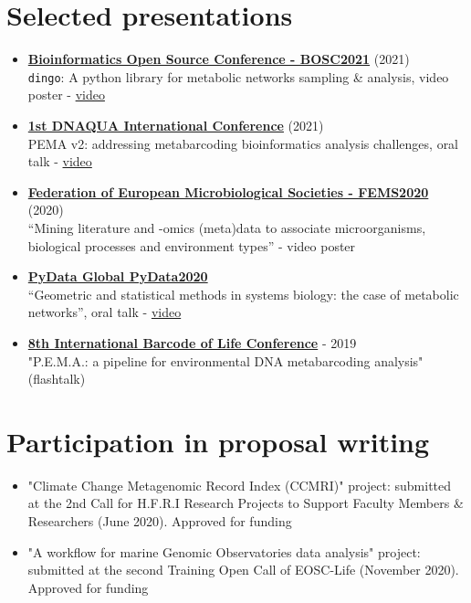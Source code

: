 \section*{Selected presentations}
\begin{itemize}
   \item \textbf{\href{https://www.open-bio.org/events/bosc-2021/}{Bioinformatics Open Source Conference - BOSC2021}} (2021) \\
         \texttt{dingo}: A python library for metabolic networks sampling \& analysis, video poster - \href{https://www.youtube.com/watch?v=IyRD4N6iBu0&t=1s}{video}
   \item \textbf{\href{https://symposium.inrae.fr/dnaqua-conference-evian2021/}{1st DNAQUA International Conference}} (2021)\\
         PEMA v2: addressing metabarcoding bioinformatics analysis challenges, oral talk - \href{https://www.youtube.com/watch?v=kht_LKMmB6w}{video} 
   \item  \textbf{\href{https://fems2020belgrade.com/}{Federation of European Microbiological Societies - FEMS2020}} (2020) \\
         “Mining literature and -omics (meta)data to associate microorganisms, biological processes and environment types” - video poster
   \item \textbf{\href{https://pydata.org/global2020/}{PyData Global PyData2020}} \\
   “Geometric and statistical methods in systems biology: the case of metabolic networks”, oral talk - \href{https://www.youtube.com/watch?v=zg8KFZ_LbHM}{video}
   \item \textbf{\href{http://dnabarcodes2019.org/}{8th International Barcode of Life Conference}} - 2019 \\
   "P.E.M.A.: a pipeline for environmental DNA metabarcoding analysis" (flashtalk)
\end{itemize}


\section*{Participation in proposal writing}

\begin{itemize}
   \item "Climate Change Metagenomic Record Index (CCMRI)" project: submitted at the
   2nd Call for H.F.R.I Research Projects to Support Faculty Members \& Researchers (June 2020). 
   Approved for funding
   \item  "A workflow for marine Genomic Observatories data analysis" project: submitted at the second Training Open Call of EOSC-Life (November 2020). 
   Approved for funding 
\end{itemize}


